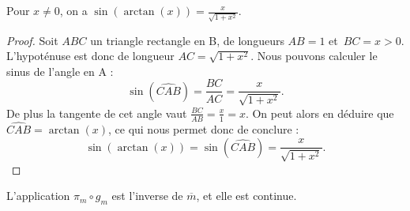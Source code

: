 \documentclass[hidelinks, 10pt]{article}
\begin{document}
\begin{proposition}\label{prop:sin-arc}
Pour $x\neq0$, on a $\sin(\arctan(x))=\frac{x}{\sqrt{1+x^2}}$.
\end{proposition}
\begin{proof}
Soit $ABC$ un triangle rectangle en B, de longueurs $AB=1$ et~$BC=x>0$. L'hypoténuse est donc de longueur $AC=\sqrt{1+x^2}$. Nous pouvons calculer le sinus de l'angle en A : \[\sin(\widehat{CAB})=\frac{BC}{AC}=\frac{x}{\sqrt{1+x^2}}.\]De plus la tangente de cet angle vaut $\frac{BC}{AB}=\frac{x}{1}=x$. On peut alors en déduire que $\widehat{CAB}=\arctan(x)$, ce qui nous permet donc de conclure : \[\sin(\arctan(x))=\sin(\widehat{CAB})=\frac{x}{\sqrt{1+x^2}}.\]
\end{proof}

\begin{lemma}\label{lemma:mobius-inv-continuous}
L'application $\pi_m\circ g_m$ est l'inverse de $\overline{m}$, et elle est continue.
\end{lemma}
\end{document}
